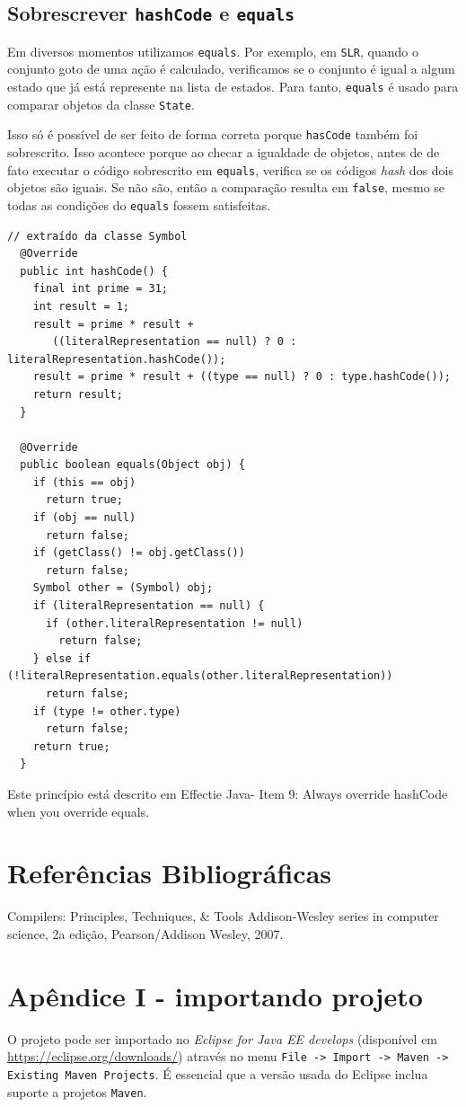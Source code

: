 \documentclass[11pt]{article}
\begin{document}
\subsection{Sobrescrever \texttt{hashCode} e \texttt{equals}}
\label{sec:orgheadline22}
Em diversos momentos utilizamos \texttt{equals}. Por exemplo, em \texttt{SLR}, quando 
o conjunto goto de uma ação é calculado, verificamos se o conjunto é igual a algum
estado que já está represente na lista de estados. Para tanto, \texttt{equals} é usado
para comparar objetos da classe \texttt{State}.

Isso só é possível de ser feito de forma correta porque \texttt{hasCode} também foi
sobrescrito. Isso acontece porque ao checar a igualdade de objetos, antes de
de fato executar o código sobrescrito em \texttt{equals}, verifica se os códigos \emph{hash}
dos dois objetos são iguais. Se não são, então a comparação resulta em \texttt{false},
mesmo se todas as condições do \texttt{equals} fossem satisfeitas.

\begin{verbatim}
// extraído da classe Symbol
  @Override
  public int hashCode() {
    final int prime = 31;
    int result = 1;
    result = prime * result + 
       ((literalRepresentation == null) ? 0 : literalRepresentation.hashCode());
    result = prime * result + ((type == null) ? 0 : type.hashCode());
    return result;
  }

  @Override
  public boolean equals(Object obj) {
    if (this == obj)
      return true;
    if (obj == null)
      return false;
    if (getClass() != obj.getClass())
      return false;
    Symbol other = (Symbol) obj;
    if (literalRepresentation == null) {
      if (other.literalRepresentation != null)
        return false;
    } else if (!literalRepresentation.equals(other.literalRepresentation))
      return false;
    if (type != other.type)
      return false;
    return true;
  }
\end{verbatim}

Este princípio está descrito em Effectie Java- Item 9: Always override hashCode when you override equals.

\section{Referências Bibliográficas}
\label{sec:orgheadline23}
Compilers: Principles, Techniques, \& Tools Addison-Wesley series in computer science, 2a edição, Pearson/Addison Wesley, 2007.

\section{Apêndice I - importando projeto}
\label{sec:orgheadline24}
O projeto pode ser importado no \emph{Eclipse for Java EE develops}  (disponível em
\url{https://eclipse.org/downloads/}) através no menu \texttt{File -> Import -> Maven ->
Existing Maven Projects}.
É essencial que a versão usada do Eclipse inclua suporte a projetos \texttt{Maven}.
\end{document}

